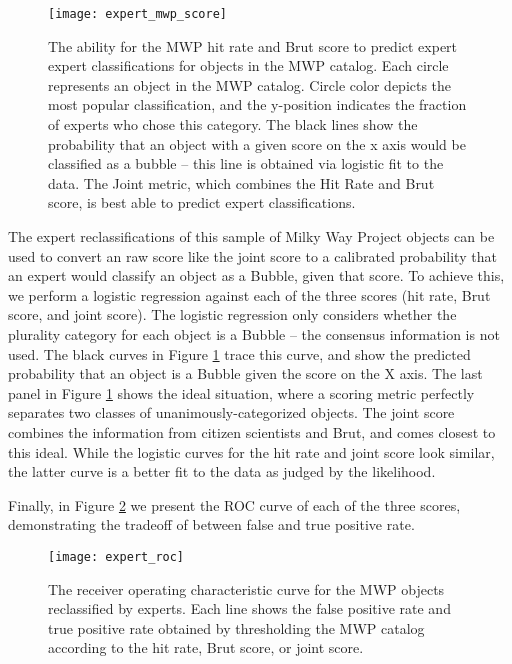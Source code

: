 \documentclass[preprint]{aastex}
\begin{document}
\begin{figure}
\texttt{[image: expert\_mwp\_score]}
\caption{The ability for the MWP hit rate and Brut score to predict expert expert classifications for objects in the MWP catalog. Each circle represents an object in the MWP catalog. Circle color depicts the most popular classification, and the y-position indicates the fraction of experts who chose this category. The
black lines show the probability that an object with a given score on the x axis would be classified as a bubble -- this line is obtained via  logistic fit to the data. The Joint metric, which combines the Hit Rate and Brut score, is best able to predict expert classifications.}
\label{fig:expert_mwp_score}
\end{figure}

The expert reclassifications of this sample of Milky Way Project objects can be used to convert an raw score like the joint score to a calibrated probability that an expert would classify an object as a Bubble, given that score. To achieve this, we perform a logistic regression against each of the three scores (hit rate, Brut score, and joint score). The logistic regression only considers whether the plurality category for each object is a Bubble -- the consensus information is not used. The black curves in Figure \ref{fig:expert_mwp_score} trace this curve, and show the predicted probability that an object is a Bubble given the score on the X axis. The last panel in Figure \ref{fig:expert_mwp_score} shows the ideal situation, where a scoring metric perfectly separates two classes of unanimously-categorized objects. The joint score combines the information from citizen scientists and Brut, and comes closest to this ideal. While the logistic curves for the hit rate and joint score look similar, the latter curve is a better fit to the data as judged by the likelihood.

Finally, in Figure \ref{fig:expert_roc} we present the ROC curve of each of the three scores, demonstrating the tradeoff of between false and true positive rate.

\begin{figure}
\texttt{[image: expert\_roc]}
\caption{The receiver operating characteristic curve for the MWP objects reclassified by experts. Each line shows the false positive rate and true positive rate obtained by thresholding the MWP catalog according to the hit rate, Brut score, or joint score. }
\label{fig:expert_roc}
\end{figure}
\end{document}
